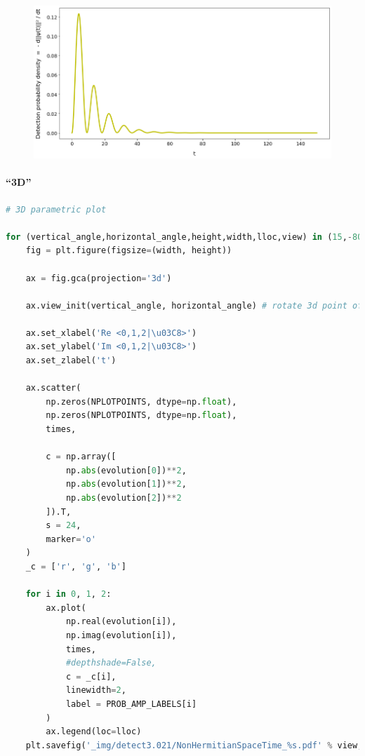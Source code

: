 \begin{figure}[h!]
\centering
\includegraphics[width=0.66\linewidth]{tex/appendix/nb/jupyter/3lev/output_46_0.png}

\end{figure}

\hypertarget{d}{%
\paragraph{``3D''}\label{d}}

\begin{lstlisting}[language=Python]
# 3D parametric plot

for (vertical_angle,horizontal_angle,height,width,lloc,view) in (15,-80,15,15,'center left','side'), (90, -80, 15, 15,'center left','top'):
    fig = plt.figure(figsize=(width, height))

    ax = fig.gca(projection='3d')

    ax.view_init(vertical_angle, horizontal_angle) # rotate 3d point of view

    ax.set_xlabel('Re <0,1,2|\u03C8>')
    ax.set_ylabel('Im <0,1,2|\u03C8>')
    ax.set_zlabel('t')
    
    ax.scatter(
        np.zeros(NPLOTPOINTS, dtype=np.float),
        np.zeros(NPLOTPOINTS, dtype=np.float),
        times,
    
        c = np.array([
            np.abs(evolution[0])**2,
            np.abs(evolution[1])**2,
            np.abs(evolution[2])**2
        ]).T,
        s = 24,
        marker='o'
    )
    _c = ['r', 'g', 'b']
        
    for i in 0, 1, 2:
        ax.plot(
            np.real(evolution[i]),
            np.imag(evolution[i]),
            times,
            #depthshade=False,
            c = _c[i],
            linewidth=2,
            label = PROB_AMP_LABELS[i]
        )
        ax.legend(loc=lloc)
    plt.savefig('_img/detect3.021/NonHermitianSpaceTime_%s.pdf' % view, bbox_inches='tight', pad_inches=0)
\end{lstlisting}

